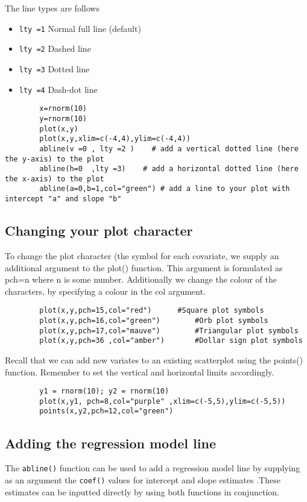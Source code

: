 \documentclass[a4paper,12pt]{article}
\begin{document}
\begin{itemize}
\begin{itemize}
		The line types are follows
		\begin{itemize}
			\item	\texttt{lty =1}   Normal full line (default)
			\item	\texttt{lty =2}   Dashed line
			\item	\texttt{lty =3}   Dotted line
			\item	\texttt{lty =4}   Dash-dot line
		\end{itemize}
		\large \begin{verbatim}
		x=rnorm(10)
		y=rnorm(10)
		plot(x,y)
		plot(x,y,xlim=c(-4,4),ylim=c(-4,4))
		abline(v =0 , lty =2 )    # add a vertical dotted line (here the y-axis) to the plot
		abline(h=0  ,lty =3)    # add a horizontal dotted line (here the x-axis) to the plot
		abline(a=0,b=1,col="green") # add a line to your plot with intercept "a" and slope "b"
		\end{verbatim}\large
		
		\subsection{Changing your plot character}
		
		To change the plot character (the symbol for each covariate, we supply an additional argument to the plot() function.  This argument is formulated as pch=n where n is some number.
		Additionally we change the colour of the characters, by specifying a colour in the col argument.
		\large \begin{verbatim}
		plot(x,y,pch=15,col="red")		#Square plot symbols
		plot(x,y,pch=16,col="green")		#Orb plot symbols
		plot(x,y,pch=17,col="mauve")		#Triangular plot symbols
		plot(x,y,pch=36	,col="amber")		#Dollar sign plot symbols
		\end{verbatim}\large
		Recall that we can add new variates to an existing scatterplot using the points() function. Remember to set the vertical and horizontal limits accordingly.
		\large \begin{verbatim}
		y1 = rnorm(10); y2 = rnorm(10)
		plot(x,y1, pch=8,col="purple" ,xlim=c(-5,5),ylim=c(-5,5))
		points(x,y2,pch=12,col="green")
		\end{verbatim}\large
		\subsection{Adding the regression model line}
		
		The \texttt{abline()} function can be used to add a regression model line  by supplying as an argument the \texttt{coef()} values for intercept and slope estimates .These estimates can be inputted directly by using both functions in conjunction.
		

\end{itemize}
\end{itemize}
\end{document}
